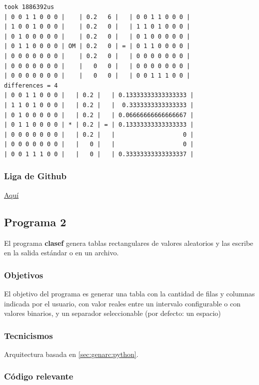 \documentclass{article}[12pt,a4paper]
\begin{document}
\begin{verbatim}
took 1886392us
| 0 0 1 1 0 0 0 |    | 0.2   6 |   | 0 0 1 1 0 0 0 |
| 1 0 0 1 0 0 0 |    | 0.2   0 |   | 1 1 0 1 0 0 0 |
| 0 1 0 0 0 0 0 |    | 0.2   0 |   | 0 1 0 0 0 0 0 |
| 0 1 1 0 0 0 0 | OM | 0.2   0 | = | 0 1 1 0 0 0 0 |
| 0 0 0 0 0 0 0 |    | 0.2   0 |   | 0 0 0 0 0 0 0 |
| 0 0 0 0 0 0 0 |    |   0   0 |   | 0 0 0 0 0 0 0 |
| 0 0 0 0 0 0 0 |    |   0   0 |   | 0 0 1 1 1 0 0 |
differences = 4
| 0 0 1 1 0 0 0 |   | 0.2 |   | 0.13333333333333333 |
| 1 1 0 1 0 0 0 |   | 0.2 |   |  0.3333333333333333 |
| 0 1 0 0 0 0 0 |   | 0.2 |   | 0.06666666666666667 |
| 0 1 1 0 0 0 0 | * | 0.2 | = | 0.13333333333333333 |
| 0 0 0 0 0 0 0 |   | 0.2 |   |                   0 |
| 0 0 0 0 0 0 0 |   |   0 |   |                   0 |
| 0 0 1 1 1 0 0 |   |   0 |   | 0.33333333333333337 |
\end{verbatim}

\subsubsection{Liga de \textbf{Github}}

\href{https://github.com/MarcosHCK/master-programming/tree/master/clase89ac}{Aquí \faGithubSquare}

\subsection{Programa 2}

El programa \textbf{clasef} genera tablas rectangulares de valores aleatorios y las escribe en la salida estándar o en un archivo.

\subsubsection{Objetivos}

El objetivo del programa es generar una tabla con la cantidad de filas y columnas indicada por el usuario, con valor reales entre un intervalo configurable o con valores binarios, y un separador seleccionable (por defecto: un espacio)

\subsubsection{Tecnicismos}

Arquitectura basada en \ref{sec:genarc:python}.

\subsubsection{Código relevante}
\end{document}
